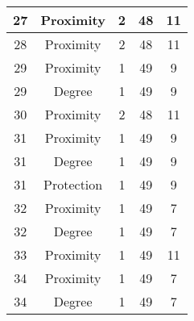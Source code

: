 \documentclass[results.tex]{subfiles}
\begin{document}
\begin{center}
\begin{tabular}{| c || c | c | c | c |}
            \hline
            27                      & Proximity                    & 2                      & 48                      & 11                   \\
            \hline
            28                      & Proximity                    & 2                      & 48                      & 11                   \\
            \hline
            29                      & Proximity                    & 1                      & 49                      & 9                    \\
            \hline
            29                      & Degree                       & 1                      & 49                      & 9                    \\
            \hline
            30                      & Proximity                    & 2                      & 48                      & 11                   \\
            \hline
            31                      & Proximity                    & 1                      & 49                      & 9                    \\
            \hline
            31                      & Degree                       & 1                      & 49                      & 9                    \\
            \hline
            31                      & Protection                   & 1                      & 49                      & 9                    \\
            \hline
            32                      & Proximity                    & 1                      & 49                      & 7                    \\
            \hline
            32                      & Degree                       & 1                      & 49                      & 7                    \\
            \hline
            33                      & Proximity                    & 1                      & 49                      & 11                   \\
            \hline
            34                      & Proximity                    & 1                      & 49                      & 7                    \\
            \hline
            34                      & Degree                       & 1                      & 49                      & 7                    \\

\end{tabular}
\end{center}
\end{document}
